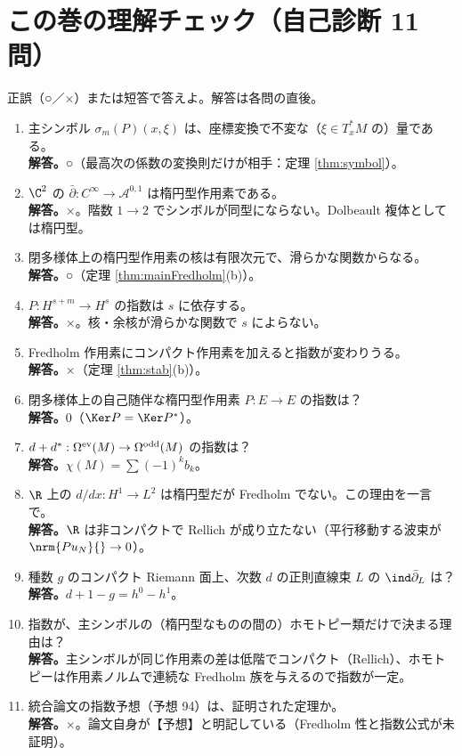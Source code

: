 \section{この巻の理解チェック（自己診断 11 問）}\label{sec:check}
正誤（○／×）または短答で答えよ。解答は各問の直後。
\begin{enumerate}
\item 主シンボル $\sigma_m(P)(x,\xi)$ は、座標変換で不変な（$\xi\in T_x^*M$ の）量である。\\
\textbf{解答。}○（最高次の係数の変換則だけが相手：定理 \ref{thm:symbol}）。
\item $\C^2$ の $\bar\partial:C^\infty\to\mathcal A^{0,1}$ は楕円型作用素である。\\
\textbf{解答。}×。階数 $1\to2$ でシンボルが同型にならない。Dolbeault 複体としては楕円型。
\item 閉多様体上の楕円型作用素の核は有限次元で、滑らかな関数からなる。\\
\textbf{解答。}○（定理 \ref{thm:mainFredholm}(b)）。
\item $P:H^{s+m}\to H^s$ の指数は $s$ に依存する。\\
\textbf{解答。}×。核・余核が滑らかな関数で $s$ によらない。
\item Fredholm 作用素にコンパクト作用素を加えると指数が変わりうる。\\
\textbf{解答。}×（定理 \ref{thm:stab}(b)）。
\item 閉多様体上の自己随伴な楕円型作用素 $P:E\to E$ の指数は？\\
\textbf{解答。}$0$（$\Ker P=\Ker P^*$）。
\item $d+d^*:\Omega^{\rm ev}(M)\to\Omega^{\rm odd}(M)$ の指数は？\\
\textbf{解答。}$\chi(M)=\sum(-1)^kb_k$。
\item $\R$ 上の $d/dx:H^1\to L^2$ は楕円型だが Fredholm でない。この理由を一言で。\\
\textbf{解答。}$\R$ は非コンパクトで Rellich が成り立たない（平行移動する波束が $\nrm{Pu_N}{}\to0$）。
\item 種数 $g$ のコンパクト Riemann 面上、次数 $d$ の正則直線束 $L$ の $\ind\bar\partial_L$ は？\\
\textbf{解答。}$d+1-g=h^0-h^1$。
\item 指数が、主シンボルの（楕円型なものの間の）ホモトピー類だけで決まる理由は？\\
\textbf{解答。}主シンボルが同じ作用素の差は低階でコンパクト（Rellich）、ホモトピーは作用素ノルムで連続な Fredholm 族を与えるので指数が一定。
\item 統合論文の指数予想（予想 94）は、証明された定理か。\\
\textbf{解答。}×。論文自身が【予想】と明記している（Fredholm 性と指数公式が未証明）。
\end{enumerate}

